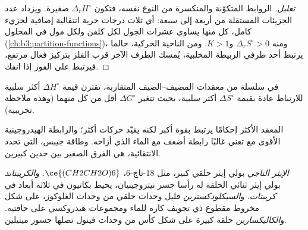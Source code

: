 \begin{proof}[تعليل]
الروابط المتكوّنة والمنكسرة من النوع نفسه، فتكون $\Delta_rH^\circ$ صغيرة. ويزداد عدد
الجزيئات المستقلة من أربعة إلى سبعة: أي ثلاث درجات حرية انتقالية
إضافية لجزيء كامل، كل منها يساوي عشرات الجول لكل كلفن
ولكل مول في المحلول (\cref{ch:b3:partition-functions})، ومنه $\Delta_rS^\circ > 0$ و$K > 1$.
ومن الناحية الحركية، حالما يرتبط أحد طرفي الربيطة المخلبية، يُمسك الطرف الآخر قرب
الفلز بتركيز فعال مرتفع، فيرتبط على الفور إذا انفك.
\end{proof}

\begin{proposition}\label{prop:b3:supramolecular:compensation}
في سلسلة من معقدات المضيف--الضيف المتقاربة، تقترن قيمة $\Delta H^\circ$ أكثر سلبية للارتباط
عادة بقيمة $\Delta S^\circ$ أكثر سلبية، بحيث تتغير $\Delta G^\circ$ أقل من كل منهما (وهذه
ملاحظة تجريبية).
\end{proposition}

المعقد الأكثر إحكامًا يرتبط بقوة أكبر لكنه يقيّد حركات  
 أكثر؛ والرابطة الهيدروجينية الأقوى مع  تعني غالبًا رابطة أضعف مع
الماء الذي أزاحه. وطاقة جيبس، التي تحدد الانتقائية، هي الفرق الصغير
بين حدين كبيرين.

\begin{definition}[المضيفات]\label{def:b3:supramolecular:hosts}
\emph{الإيثر التاجي} بولي إيثر حلقي كبير، مثل
18-تاج-6، $\ce{(CH2CH2O)6}$. و\emph{الكريبتاند} بولي إيثر
ثنائي الحلقة له رأسا جسر نيتروجينيان، يحيط بكاتيون في ثلاثة
أبعاد في \emph{كريبتات}. 
و\emph{السيكلودكسترين} قليل وحدات حلقي من وحدات الغلوكوز، على
شكل مخروط مقطوع ذي تجويف كاره للماء ومجموعات هيدروكسي على
حافتيه. و\emph{الكاليكسارين} حلقة كبيرة على شكل كأس من
وحدات فينول تصلها جسور ميثيلين.
\end{definition}

